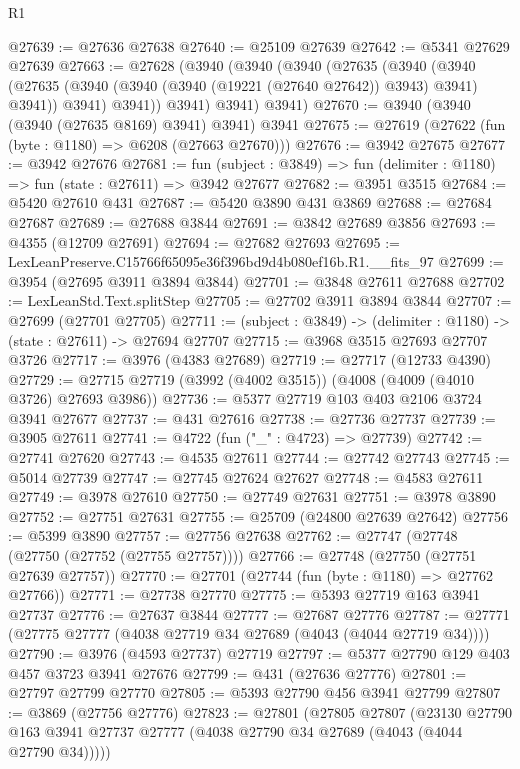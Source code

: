 \begin{lexlean}{R1}
\begin{coremodule}
@27639 := @27636 @27638
@27640 := @25109 @27639
@27642 := @5341 @27629 @27639
@27663 := @27628
    (@3940
      (@3940
        (@3940
          (@27635
            (@3940
              (@3940
                (@27635 (@3940 (@3940 (@3940 (@19221 (@27640 @27642)) @3943) @3941) @3941))
                @3941)
              @3941))
          @3941)
        @3941)
      @3941)
@27670 := @3940 (@3940 (@3940 (@27635 @8169) @3941) @3941) @3941
@27675 := @27619 (@27622 (fun (byte : @1180) => @6208 (@27663 @27670)))
@27676 := @3942 @27675
@27677 := @3942 @27676
@27681 := fun (subject : @3849) => fun (delimiter : @1180) => fun (state : @27611) => @3942 @27677
@27682 := @3951 @3515
@27684 := @5420 @27610 @431
@27687 := @5420 @3890 @431 @3869
@27688 := @27684 @27687
@27689 := @27688 @3844
@27691 := @3842 @27689 @3856
@27693 := @4355 (@12709 @27691)
@27694 := @27682 @27693
@27695 := LexLeanPreserve.C15766f65095e36f396bd9d4b080ef16b.R1.__fits_97
@27699 := @3954 (@27695 @3911 @3894 @3844)
@27701 := @3848 @27611 @27688
@27702 := LexLeanStd.Text.splitStep
@27705 := @27702 @3911 @3894 @3844
@27707 := @27699 (@27701 @27705)
@27711 := (subject : @3849) -> (delimiter : @1180) -> (state : @27611) -> @27694 @27707
@27715 := @3968 @3515 @27693 @27707 @3726
@27717 := @3976 (@4383 @27689)
@27719 := @27717 (@12733 @4390)
@27729 := @27715 @27719 (@3992 (@4002 @3515)) (@4008 (@4009 (@4010 @3726) @27693 @3986))
@27736 := @5377 @27719 @103 @403 @2106 @3724 @3941 @27677
@27737 := @431 @27616
@27738 := @27736 @27737
@27739 := @3905 @27611
@27741 := @4722 (fun ("_" : @4723) => @27739)
@27742 := @27741 @27620
@27743 := @4535 @27611
@27744 := @27742 @27743
@27745 := @5014 @27739
@27747 := @27745 @27624 @27627
@27748 := @4583 @27611
@27749 := @3978 @27610
@27750 := @27749 @27631
@27751 := @3978 @3890
@27752 := @27751 @27631
@27755 := @25709 (@24800 @27639 @27642)
@27756 := @5399 @3890
@27757 := @27756 @27638
@27762 := @27747 (@27748 (@27750 (@27752 (@27755 @27757))))
@27766 := @27748 (@27750 (@27751 @27639 @27757))
@27770 := @27701 (@27744 (fun (byte : @1180) => @27762 @27766))
@27771 := @27738 @27770
@27775 := @5393 @27719 @163 @3941 @27737
@27776 := @27637 @3844
@27777 := @27687 @27776
@27787 := @27771 (@27775 @27777 (@4038 @27719 @34 @27689 (@4043 (@4044 @27719 @34))))
@27790 := @3976 (@4593 @27737) @27719
@27797 := @5377 @27790 @129 @403 @457 @3723 @3941 @27676
@27799 := @431 (@27636 @27776)
@27801 := @27797 @27799 @27770
@27805 := @5393 @27790 @456 @3941 @27799
@27807 := @3869 (@27756 @27776)
@27823 := @27801
    (@27805
      @27807
      (@23130 @27790 @163 @3941 @27737 @27777 (@4038 @27790 @34 @27689 (@4043 (@4044 @27790 @34)))))

\end{coremodule}
\end{lexlean}
